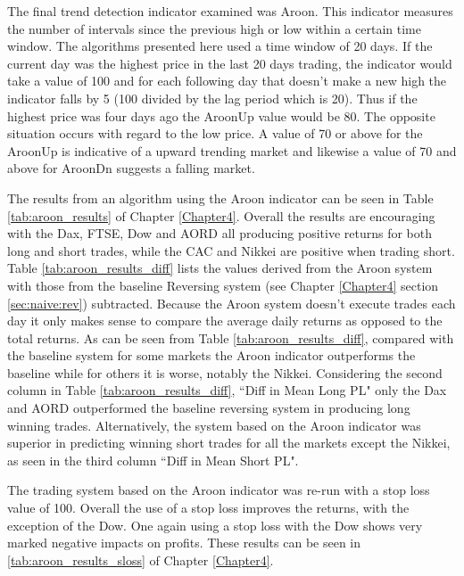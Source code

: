 The final trend detection indicator examined was Aroon.  This indicator measures the number of intervals since the previous high or low within a certain time window. The algorithms presented here used a time window of 20 days. If the current day was the highest price in the last 20 days trading, the indicator would take a value of 100 and for each following day that doesn't make a new high the indicator falls by 5 (100 divided by the lag period which is 20).  Thus if the highest price was four days ago the AroonUp value would be 80. The opposite situation occurs with regard to the low price. A value of 70 or above for the AroonUp is indicative of a upward trending market and likewise a value of 70 and above for AroonDn suggests a falling market.

The results from an algorithm using the Aroon indicator can be seen in Table \ref{tab:aroon_results} of Chapter \ref{Chapter4}. Overall the results are encouraging with the Dax, FTSE, Dow and AORD all producing positive returns for both long and short trades, while the CAC and Nikkei are positive when trading short. Table \ref{tab:aroon_results_diff} lists the values derived from the Aroon system with those from the baseline Reversing system (see Chapter \ref{Chapter4} section \ref{sec:naive:rev}) subtracted. Because the Aroon system doesn't execute trades each day it only makes sense to compare the average daily returns as opposed to the total returns. As can be seen from  Table \ref{tab:aroon_results_diff}, compared with the baseline system for some markets the Aroon indicator outperforms the baseline while for others it is worse, notably the Nikkei. Considering the second column in Table \ref{tab:aroon_results_diff}, \textquotedblleft Diff in Mean Long PL" only the Dax and AORD outperformed the baseline reversing system in producing long winning trades. Alternatively, the system based on the Aroon indicator was superior in predicting winning short trades for all the markets except the Nikkei, as seen in the third column \textquotedblleft Diff in Mean Short PL".



The trading system based on the Aroon indicator was re-run with a stop loss value of 100. Overall the use of a stop loss improves the returns, with the exception of the Dow. One again using a stop loss with the Dow shows very marked negative impacts on profits. These results can be seen in \ref{tab:aroon_results_sloss} of Chapter \ref{Chapter4}.

